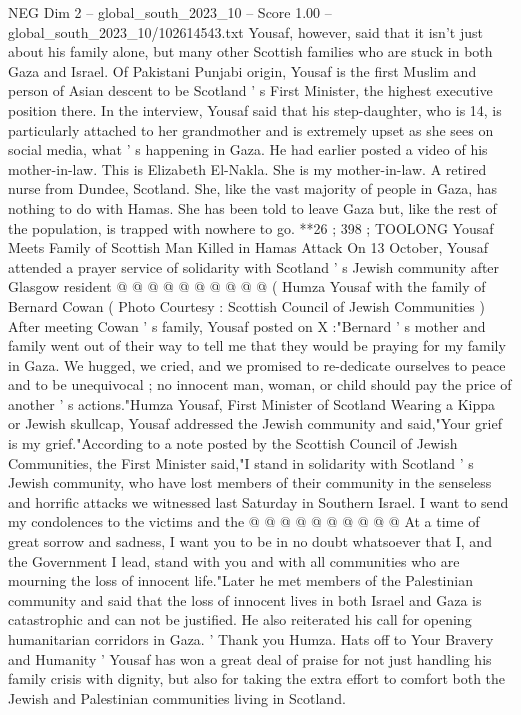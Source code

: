 \begin{textsample}{NEG Dim 2 – global\_south\_2023\_10 – Score 1.00 – global\_south\_2023\_10/102614543.txt}  \label{ex:f2_neg_389}
Yousaf, however, said that it isn't just about his family alone, but many other Scottish families who are stuck in both Gaza and Israel.
Of Pakistani Punjabi origin, Yousaf is the first Muslim and person of Asian descent to be Scotland ' s First Minister, the highest executive position there.
In the interview, Yousaf said that his step-daughter, who is 14, is particularly attached to her grandmother and is extremely upset as she sees on social media, what ' s happening in Gaza.
He had earlier posted a video of his mother-in-law.
This is Elizabeth El-Nakla.
She is my mother-in-law.
A retired nurse from Dundee, Scotland.
She, like the vast majority of people in Gaza, has nothing to do with Hamas.
She has been told to leave Gaza but, like the rest of the population, is trapped with nowhere to go. **26 ; 398 ; TOOLONG Yousaf Meets Family of Scottish Man Killed in Hamas Attack On 13 October, Yousaf attended a prayer service of solidarity with Scotland ' s Jewish community after Glasgow resident @ @ @ @ @ @ @ @ @ @ ( Humza Yousaf with the family of Bernard Cowan ( Photo Courtesy : Scottish Council of Jewish Communities ) After meeting Cowan ' s family, Yousaf posted on X :"Bernard ' s mother and family went out of their way to tell me that they would be praying for my family in Gaza.
We hugged, we cried, and we promised to re-dedicate ourselves to peace and to be unequivocal ; no innocent man, woman, or child should pay the price of another ' s actions."Humza Yousaf, First Minister of Scotland Wearing a Kippa or Jewish skullcap, Yousaf addressed the Jewish community and said,"Your grief is my grief."According to a note posted by the Scottish Council of Jewish Communities, the First Minister said,"I stand in solidarity with Scotland ' s Jewish community, who have lost members of their community in the senseless and horrific attacks we witnessed last Saturday in Southern Israel.
I want to send my condolences to the victims and the @ @ @ @ @ @ @ @ @ @ At a time of great sorrow and sadness, I want you to be in no doubt whatsoever that I, and the Government I lead, stand with you and with all communities who are mourning the loss of innocent life."Later he met members of the Palestinian community and said that the loss of innocent lives in both Israel and Gaza is catastrophic and can not be justified.
He also reiterated his call for opening humanitarian corridors in Gaza. ' Thank you Humza.
Hats off to Your Bravery and Humanity ' Yousaf has won a great deal of praise for not just handling his family crisis with dignity, but also for taking the extra effort to comfort both the Jewish and Palestinian communities living in Scotland.

\end{textsample}
